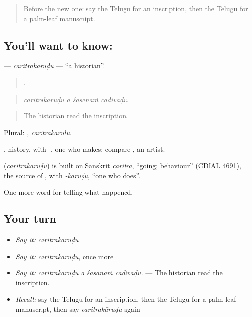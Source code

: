 \label{lesson:TE-C368-caritrakarudu}



\begin{quote}
Before the new one: say the Telugu for an inscription, then the Telugu for a palm-leaf manuscript.
\end{quote}

\subsection*{You'll want to know: }
\textbf{} — \emph{caritrakāruḍu} — \textquotedblleft{}a historian\textquotedblright{}.

\begin{quote}
   .
\end{quote}

\begin{quote}
\emph{caritrakāruḍu ā śāsanaṁ cadivāḍu.}
\end{quote}

\begin{quote}
The historian read the inscription.
\end{quote}

Plural: , \emph{caritrakārulu}.

, history, with -, one who makes: compare , an artist.

\begin{cousinweb}
\textbf{} (\emph{caritrakāruḍu}) is built on Sanskrit \emph{caritra}, \textquotedblleft{}going; behaviour\textquotedblright{} (CDIAL 4691), the source of , with \emph{-kāruḍu}, \textquotedblleft{}one who does\textquotedblright{}.
\end{cousinweb}

\begin{grammarlens}[title={What you've built}]
One more word for telling what happened.
\end{grammarlens}

\subsection*{Your turn}
\begin{itemize}
\raggedright
  \item \emph{Say it:} \emph{caritrakāruḍu}
  \item \emph{Say it:} \emph{caritrakāruḍu}, once more
  \item \emph{Say it:} \emph{caritrakāruḍu ā śāsanaṁ cadivāḍu.} — The historian read the inscription.
  \item \emph{Recall:} say the Telugu for an inscription, then the Telugu for a palm-leaf manuscript, then say \emph{caritrakāruḍu} again
\end{itemize}

